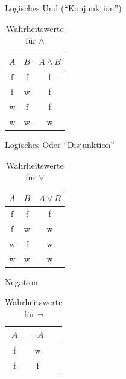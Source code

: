     \begin{frame}{Logisches Und ("`Konjunktion"')}
        \begin{table}
            \caption{Wahrheitswerte für $\wedge$}
            \begin{center}
                \begin{tabular}{ccc}
                    \toprule
                    $A$ & $B$ & $A \wedge B$\\
                    \midrule
                    f & f & f\\
                    f & w & f\\
                    w & f & f\\
                    w & w & w\\
                    \bottomrule
                \end{tabular}
             \end{center}
        \end{table}
    \end{frame}

    \begin{frame}{Logisches Oder "`Disjunktion"'}
        \begin{table}
            \caption{Wahrheitswerte für $\vee$}
            \begin{center}
                \begin{tabular}{ccc}
                    \toprule
                    $A$ & $B$ & $A \vee B$\\
                    \midrule
                    f & f & f\\
                    f & w & w\\
                    w & f & w\\
                    w & w & w\\
                    \bottomrule
                \end{tabular}
             \end{center}
        \end{table}
    \end{frame}

    \begin{frame}{Negation}
        \begin{table}
            \caption{Wahrheitswerte für $\neg$}
            \begin{center}
                \begin{tabular}{ccc}
                    \toprule
                    $A$ & $ \neg A$\\
                    \midrule
                    f & w\\
                    f & f\\
                    \bottomrule
                \end{tabular}
             \end{center}
        \end{table}
    \end{frame}

